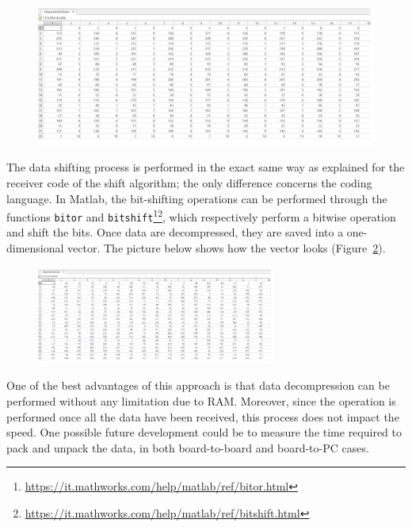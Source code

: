 \documentclass{Configuration_Files/PoliMi3i_thesis}
\begin{document}
\begin{figure}[H]
\centering
\includegraphics[scale=0.7]{Board_Windows_PC/6.png}
\label{fig:shifted_bytes}
\end{figure}

The data shifting process is performed in the exact same way as explained for the receiver code of the shift algorithm; the only difference concerns the coding language. In Matlab, the bit-shifting operations can be performed through the functions \texttt{bitor} and \texttt{bitshift}\footnote{\url{https://it.mathworks.com/help/matlab/ref/bitor.html}}\footnote{\url{https://it.mathworks.com/help/matlab/ref/bitshift.html}}, which respectively perform a bitwise operation and shift the bits. Once data are decompressed, they are saved into a one-dimensional vector. The picture below shows how the vector looks (Figure~\ref{fig:shifted_data}).

\begin{figure}[H]
\centering
\includegraphics[width=0.7\textwidth]{Board_Windows_PC/7.png}
\label{fig:shifted_data}
\end{figure}

One of the best advantages of this approach is that data decompression can be performed without any limitation due to RAM. Moreover, since the operation is performed once all the data have been received, this process does not impact the speed. One possible future development could be to measure the time required to pack and unpack the data, in both board-to-board and board-to-PC cases.
\end{document}
